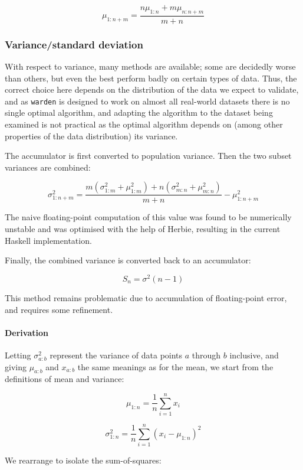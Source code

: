 \documentclass[a4paper]{article}
\begin{document}
\[\mu_{1:n+m} = \frac{n\mu_{1:n} + m\mu_{n:n+m}}{m + n}\]

\subsubsection{Variance/standard
deviation}\label{variancestandard-deviation}

With respect to variance, many methods are available; some are decidedly
worse than others, but even the best perform badly on certain types of
data. Thus, the correct choice here depends on the distribution of the
data we expect to validate, and as \texttt{warden} is designed to work
on almost all real-world datasets there is no single optimal algorithm,
and adapting the algorithm to the dataset being examined is not
practical as the optimal algorithm depends on (among other properties of
the data distribution) its variance.\cite{Ling1974}

The accumulator is first converted to population variance. Then the two
subset variances are combined:

\[\sigma_{1:n+m}^2 = \frac{m(\sigma_{1:m}^2 + \mu_{1:m}^2) + n(\sigma_{m:n}^2 + \mu_{m:n}^2)}{m + n} - \mu_{1:n+m}^2\]

The naive floating-point computation of this value was found to be
numerically unstable and was optimised with the help of Herbie\cite{panchekha2015},
resulting in the current Haskell implementation.

Finally, the combined variance is converted back to an accumulator:

\[S_n = \sigma^2(n - 1)\]

This method remains problematic due to accumulation of floating-point
error, and requires some refinement.

\paragraph{Derivation}\label{derivation-1}

Letting \(\sigma_{a:b}^2\) represent the variance of data points \(a\)
through \(b\) inclusive, and giving \(\mu_{a:b}\) and \(x_{a:b}\) the
same meanings as for the mean, we start from the definitions of mean and
variance:

\[\mu_{1:n} = \frac{1}{n} \sum\limits_{i=1}^n x_i\]

\[\sigma_{1:n}^2 = \frac{1}{n} \sum\limits_{i=1}^n (x_i - \mu_{1:n})^2\]

We rearrange to isolate the sum-of-squares:
\end{document}
